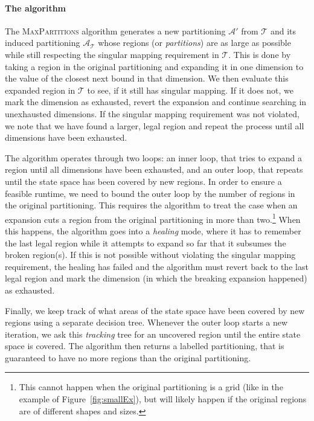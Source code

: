 \documentclass{easychair}
\begin{document}
\paragraph{The algorithm} The \textsc{MaxPartitions} algorithm generates a new
partitioning $\mathcal{A}'$ from $\mathcal{T}$ and its induced partitioning
$\mathcal{A}_{\mathcal{T}}$ whose regions (or \textit{partitions}) are as large
as possible while still respecting the singular mapping requirement in
$\mathcal{T}$. This is done by taking a region in the original partitioning and
expanding it in one dimension to the value of the closest next bound in that
dimension. We then evaluate this expanded region in $\mathcal{T}$ to see, if it
still has singular mapping. If it does not, we mark the dimension as exhausted,
revert the expansion and continue searching in unexhausted dimensions. If the
singular mapping requirement was not violated, we note that we have found a
larger, legal region and repeat the process until all dimensions have been
exhausted.

The algorithm operates through two loops: an inner loop, that tries to expand a
region until all dimensions have been exhausted, and an outer loop, that repeats
until the state space has been covered by new regions. In order to ensure a
feasible runtime, we need to bound the outer loop by the number of regions in
the original partitioning. This requires the algorithm to treat the case when an
expansion cuts a region from the original partitioning in more than
two.\footnote{%
    This cannot happen when the original partitioning is a grid (like in the
    example of Figure~\ref{fig:smallEx}), but will likely happen if the original
    regions are of different shapes and sizes.
} When this happens, the algorithm goes into a \textit{healing} mode, where it
has to remember the last legal region while it attempts to expand so far that it
subsumes the broken region(s). If this is not possible without violating the
singular mapping requirement, the healing has failed and the algorithm must
revert back to the last legal region and mark the dimension (in which the
breaking expansion happened) as exhausted.

Finally, we keep track of what areas of the state space have been covered by new
regions using a separate decision tree. Whenever the outer loop starts a new
iteration, we ask this \textit{tracking} tree for an uncovered region until the
entire state space is covered. The algorithm then returns a labelled partitioning,
that is guaranteed to have no more regions than the original partitioning.
\end{document}

